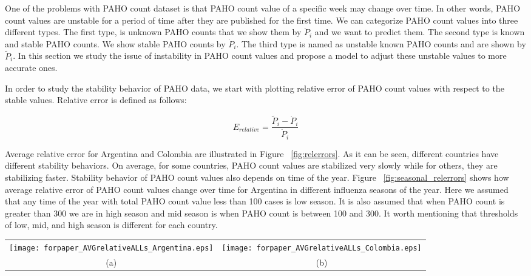 
One of the problems with PAHO count dataset is that PAHO count value of a specific week may change over time. In other words, PAHO count values are unstable for a period of time after they are published for the first time. We can categorize PAHO count values into three different types. The first type, is unknown PAHO counts that we show them by $\ddot{P}_i$ and we want to predict them. The second type is known and stable PAHO counts. We show stable PAHO counts by $\dot{P}_i$. The third type is named as unstable known PAHO counts and are shown by $\tilde{P}_i$. In this section we study the issue of instability in PAHO count values and propose a model to adjust these unstable values to more accurate ones.

In order to study the stability behavior of PAHO data, we start with plotting relative error of PAHO count values with respect to the stable values. Relative error is defined as follows:

\begin{equation}
E_{relative} = \frac{\tilde{P}_i - \dot{P}_i}{\dot{P}_i}
\end{equation}

Average relative error for Argentina and Colombia are illustrated in Figure ~\ref{fig:relerrors}. As it can be seen, different countries have different stability behaviors. On average, for some countries, PAHO count values are stabilized very slowly while for others, they are stabilizing faster. Stability behavior of PAHO count values also depends on time of the year. Figure ~\ref{fig:seasonal_relerrors} shows how average relative error of PAHO count values change over time for Argentina in different influenza seasons of the year. Here we assumed that any time of the year with total PAHO count value less than 100 cases is low season. It is also assumed that when PAHO count is greater than 300 we are in high season and mid season is when PAHO count is between 100 and 300. It worth mentioning that thresholds of low, mid, and high season is different for each country.

\begin{figure*}[h]
  \centering
   \begin{tabular}{cc}
     \texttt{[image: forpaper\_AVGrelativeALLs\_Argentina.eps]} &
     \texttt{[image: forpaper\_AVGrelativeALLs\_Colombia.eps]} \\
      (a) & (b) \\ %
  \end{tabular}
  \caption{Average relative error of PAHO count values with respect to stable values.
  (a) Argentina,
  (b) and Colombia.
  }
  \label{fig:relerrors}

\end{figure*}

